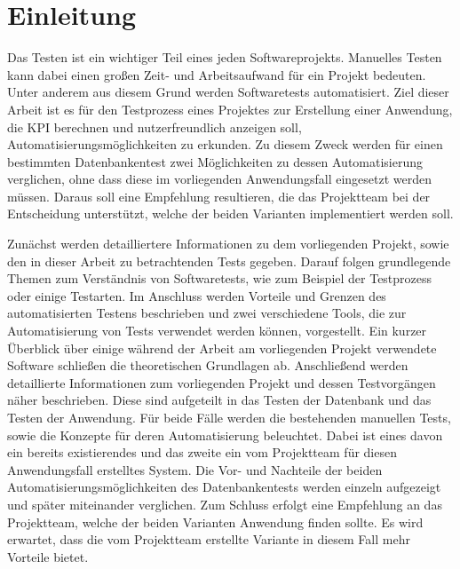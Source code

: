 \chapter{Einleitung}
\nocite{*}

Das Testen ist ein wichtiger Teil eines jeden Softwareprojekts. Manuelles Testen kann dabei einen großen Zeit- und Arbeitsaufwand für ein Projekt bedeuten. Unter anderem aus diesem Grund werden Softwaretests automatisiert. Ziel dieser Arbeit ist es für den Testprozess eines Projektes zur Erstellung einer Anwendung, die \ac{KPI} berechnen und nutzerfreundlich anzeigen soll, Automatisierungsmöglichkeiten zu erkunden. Zu diesem Zweck werden für einen bestimmten Datenbankentest zwei Möglichkeiten zu dessen Automatisierung verglichen, ohne dass diese im vorliegenden Anwendungsfall eingesetzt werden müssen. Daraus soll eine Empfehlung resultieren, die das Projektteam bei der Entscheidung unterstützt, welche der beiden Varianten implementiert werden soll.
\newline


Zunächst werden detailliertere Informationen zu dem vorliegenden Projekt, sowie den in dieser Arbeit zu betrachtenden Tests gegeben. Darauf folgen grundlegende Themen zum Verständnis von Softwaretests, wie zum Beispiel der Testprozess oder einige Testarten. Im Anschluss werden Vorteile und Grenzen des automatisierten Testens beschrieben und zwei verschiedene Tools, die zur Automatisierung von Tests verwendet werden können, vorgestellt. Ein kurzer Überblick über einige während der Arbeit am vorliegenden Projekt verwendete Software schließen die theoretischen Grundlagen ab.
Anschließend werden detaillierte Informationen zum vorliegenden Projekt und dessen Testvorgängen näher beschrieben. Diese sind aufgeteilt in das Testen der Datenbank und das Testen der Anwendung. Für beide Fälle werden die bestehenden manuellen Tests, sowie die Konzepte für deren Automatisierung beleuchtet. Dabei ist eines davon ein bereits existierendes und das zweite ein vom Projektteam für diesen Anwendungsfall erstelltes System. Die Vor- und Nachteile der beiden Automatisierungsmöglichkeiten des Datenbankentests werden einzeln aufgezeigt und später miteinander verglichen. Zum Schluss erfolgt eine Empfehlung an das Projektteam, welche der beiden Varianten Anwendung finden sollte. Es wird erwartet, dass die vom Projektteam erstellte Variante in diesem Fall mehr Vorteile bietet.